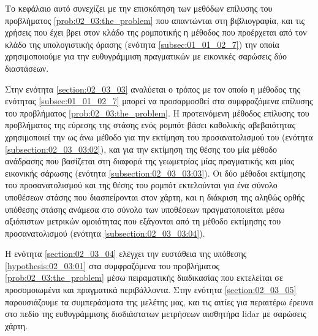 Το κεφάλαιο αυτό συνεχίζει με την επισκόπηση των μεθόδων επίλυσης του
προβλήματος \ref{prob:02_03:the_problem} που απαντώνται στη βιβλιογραφία, και
τις χρήσεις που έχει βρει στον κλάδο της ρομποτικής η μέθοδος που προέρχεται
από τον κλάδο της υπολογιστικής όρασης (ενότητα \ref{subsec:01_01_02_7}) την
οποία χρησιμοποιούμε για την ευθυγράμμιση πραγματικών με εικονικές σαρώσεις δύο
διαστάσεων.

Στην ενότητα \ref{section:02_03_03} αναλύεται ο τρόπος με τον οποίο η μέθοδος
της ενότητας \ref{subsec:01_01_02_7} μπορεί να προσαρμοσθεί στα συμφραζόμενα
επίλυσης του προβλήματος \ref{prob:02_03:the_problem}. Η προτεινόμενη μέθοδος
επίλυσης του προβλήματος της εύρεσης της στάσης ενός ρομπότ βάσει καθολικής
αβεβαιότητας χρησιμοποιεί την ως άνω μέθοδο για την εκτίμηση του
προσανατολισμού του (ενότητα \ref{subsection:02_03_03:02}), και για την
εκτίμηση της θέσης του μία μέθοδο ανάδρασης που βασίζεται στη διαφορά της
γεωμετρίας μίας πραγματικής και μίας εικονικής σάρωσης (ενότητα
\ref{subsection:02_03_03:03}). Οι δύο μέθοδοι εκτίμησης του προσανατολισμού και
της θέσης του ρομπότ εκτελούνται για ένα σύνολο υποθέσεων στάσης που
διασπείρονται στον χάρτη, και η διάκριση της αληθώς ορθής υπόθεσης στάσης
ανάμεσα στο σύνολο των υποθέσεων πραγματοποιείται μέσω αξιόπιστων μετρικών
ομοιότητας που εξάγονται από τη μέθοδο εκτίμησης του προσανατολισμού (ενότητα
\ref{subsection:02_03_03:04}).

Η ενότητα \ref{section:02_03_04} ελέγχει την ευστάθεια της υπόθεσης
\ref{hypothesis:02_03:01} στα συμφραζόμενα του προβλήματος
\ref{prob:02_03:the_problem} μέσω πειραματικής διαδικασίας που εκτελείται σε
προσομοιωμένα και πραγματικά περιβάλλοντα. Στην ενότητα \ref{section:02_03_05}
παρουσιάζουμε τα συμπεράσματα της μελέτης μας, και τις αιτίες για περαιτέρω
έρευνα στο πεδίο της ευθυγράμμισης δισδιάστατων μετρήσεων αισθητήρα lidar με
σαρώσεις χάρτη.
